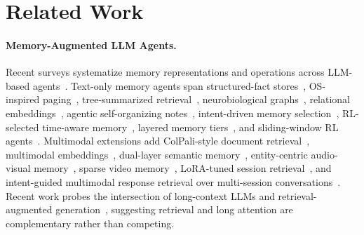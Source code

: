 \documentclass{llmxive}
\begin{document}
\section{Related Work}
\label{sec:related}

\paragraph{Memory-Augmented LLM Agents.}
Recent surveys systematize memory representations and operations across LLM-based agents~\cite{du2025rethinkingmemoryllmbased}. Text-only memory agents span structured-fact stores~\cite{memorybank,scm}, OS-inspired paging~\cite{packer2024memgptllmsoperatingsystems}, tree-summarized retrieval~\cite{raptor}, neurobiological graphs~\cite{gutierrez2025hipporagneurobiologicallyinspiredlongterm}, relational embeddings~\cite{mem0}, agentic self-organizing notes~\cite{amem}, intent-driven memory selection~\cite{du2025memguideintentdrivenmemoryselection}, RL-selected time-aware memory~\cite{du2025memoryt1reinforcementlearningtemporal}, layered memory tiers~\cite{li2025memosoperatingmemoryaugmentedgeneration}, and sliding-window RL agents~\cite{yu2025memagentreshapinglongcontextllm}. Multimodal extensions add ColPali-style document retrieval~\cite{cho2024m3docragmultimodalretrievalneed,faysse2025colpaliefficientdocumentretrieval}, multimodal embeddings~\cite{vlm2vec}, dual-layer semantic memory~\cite{m2a}, entity-centric audio-visual memory~\cite{long2025seeinglisteningrememberingreasoning}, sparse video memory~\cite{song2024moviechat}, LoRA-tuned session retrieval~\cite{jang2025enablingchatbotseyesears}, and intent-guided multimodal response retrieval over multi-session conversations~\cite{Wang_Du_Liang_Bai_Yang_Wang_Wong_Xu_2025}. Recent work probes the intersection of long-context LLMs and retrieval-augmented generation~\cite{jin2024long,jiang2024longrag,asai2023self}, suggesting retrieval and long attention are complementary rather than competing.
\end{document}
